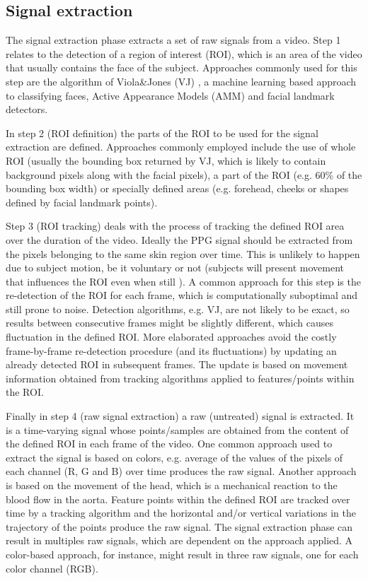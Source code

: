 \subsection{Signal extraction}

The signal extraction phase extracts a set of raw signals from a video. Step 1 relates to the detection of a region of interest (ROI), which is an area of the video that usually contains the face of the subject. Approaches commonly used for this step are the algorithm of Viola\&Jones (VJ) \parencite{ViolaJones}, a machine learning based approach to classifying faces, Active Appearance Models (AMM) \parencite{EdwardsAAM} and facial landmark detectors. %

In step 2 (ROI definition) the parts of the ROI to be used for the signal extraction are defined. Approaches commonly employed include the use of whole ROI (usually the bounding box returned by VJ, which is likely to contain background pixels along with the facial pixels), a part of the ROI (e.g. 60\% of the bounding box width) or specially defined areas (e.g. forehead, cheeks or shapes defined by facial landmark points).

Step 3 (ROI tracking) deals with the process of tracking the defined ROI area over the duration of the video. Ideally the PPG signal should be extracted from the pixels belonging to the same skin region over time. This is unlikely to happen due to subject motion, be it voluntary or not (subjects will present movement that influences the ROI even when still \parencite{poh2010non}). A common approach for this step is the re-detection of the ROI for each frame, which is computationally suboptimal and still prone to noise. Detection algorithms, e.g. VJ, are not likely to be exact, so results between consecutive frames might be slightly different, which causes fluctuation in the defined ROI. More elaborated approaches avoid the costly frame-by-frame re-detection procedure (and its fluctuations) by updating an already detected ROI in subsequent frames. The update is based on movement information obtained from tracking algorithms applied to features/points within the ROI. %

Finally in step 4 (raw signal extraction) a raw (untreated) signal is extracted. It is a time-varying signal whose points/samples are obtained from the content of the defined ROI in each frame of the video. One common approach used to extract the signal is based on colors, e.g. average of the values of the pixels of each channel (R, G and B) over time produces the raw signal. Another approach is based on the movement of the head, which is a mechanical reaction to the blood flow in the aorta. Feature points within the defined ROI are tracked over time by a tracking algorithm and the horizontal and/or vertical variations in the trajectory of the points produce the raw signal. The signal extraction phase can result in multiples raw signals, which are dependent on the approach applied. A color-based approach, for instance, might result in three raw signals, one for each color channel (RGB).

